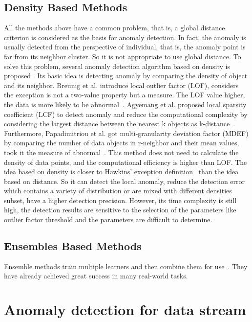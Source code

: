 \subsection{Density Based Methods}
All the methods above have a common problem,
that is,
a global distance criterion is considered as
the basis for anomaly detection.
In fact,
the anomaly is usually detected
from the perspective of individual,
that is,
the anomaly point is far from its neighbor cluster.
So it is not appropriate
to use global distance.
To solve this problem,
several anomaly detection
algorithm based
on density is proposed .
Its basic idea is detecting anomaly by comparing
the density of object and its neighbor.
Breunig et al. introduce local
outlier factor (LOF),
considers the exception is not a
two-value property but a measure.
The LOF value higher,
the data is more likely to be abnormal~\cite{breunig2000lof}.
Agyemang et al.
proposed local sparsity coefficient (LCF) to
detect anomaly and reduce
the computational complexity by considering
the largest distance between the nearest k objects as
k-distance~\cite{agyemang2004algorithm}.
Furthermore,
Papadimitriou et al. got multi-granularity
deviation factor (MDEF) by
comparing the number of data objects in r-neighbor and
their mean values,
took it the measure of abnormal~\cite{papadimitriou2003loci}.
This method does not need to calculate the density of data
points,
and the computational efficiency is higher than LOF.
The idea based on density is closer to Hawkins’ exception
definition~\cite{hawkins1980identification}
than the idea based on distance.
So it can detect the local anomaly,
reduce the detection error which contains
a variety of distribution or are mixed with different
densities subset,
have a higher detection precision.
However,
its time complexity is still high,
the detection
results are sensitive to the selection of the parameters like
outlier factor threshold and the parameters are difficult to
determine.
\subsection{Ensembles Based Methods}

Ensemble methods train multiple learners and
then combine them for use~\cite{zhou2012ensemble}.
They have already achieved great success in many
real-world tasks.
\xhanMarker


\section{Anomaly detection for data stream}
\label{sec-data_stream}



